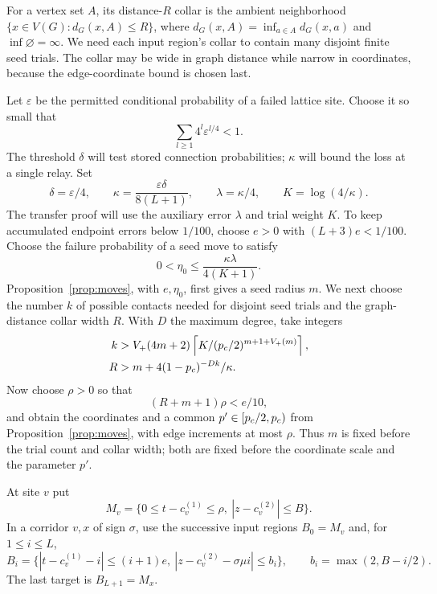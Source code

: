 For a vertex set $A$, its distance-$R$ collar is the ambient
neighborhood $\{x\in V(G):d_G(x,A)\le R\}$, where
$d_G(x,A)=\inf_{a\in A}d_G(x,a)$ and $\inf\varnothing=\infty$.
We need each input region's collar to contain many disjoint finite
seed trials. The collar may be wide in graph distance while narrow in
coordinates, because the edge-coordinate bound is chosen last.

Let $\varepsilon$ be the permitted conditional probability of a failed
lattice site. Choose it so small that
\begin{equation}\label{eq:directed-contour-series}
 \sum_{l\ge1}4^l\varepsilon^{l/4}<1.
\end{equation}
The threshold $\delta$ will test stored connection probabilities;
$\kappa$ will bound the loss at a single relay. Set
\[
 \delta=\varepsilon/4,\qquad
 \kappa=\frac{\varepsilon\delta}{8(L+1)},\qquad
 \lambda=\kappa/4,\qquad K=\log(4/\kappa).
\]
The transfer proof will use the auxiliary error $\lambda$ and trial
weight $K$. To keep accumulated endpoint errors below $1/100$, choose
$e>0$ with $(L+3)e<1/100$. Choose the failure probability of a seed
move to satisfy
\[
 0<\eta_0\le\frac{\kappa\lambda}{4(K+1)}.
\]
Proposition~\ref{prop:moves}, with $e,\eta_0$, first gives a seed
radius $m$. We next choose the number $k$ of possible contacts needed
for disjoint seed trials and the graph-distance collar width $R$.
With $D$ the maximum degree, take integers
\begin{equation}\label{eq:corridor-trial-scales}
 \begin{split}
 k&>V_+(4m+2)
       \left\lceil K/(p_c/2)^{m+1+V_+(m)}\right\rceil,\\
 R&>m+4(1-p_c)^{-Dk}/\kappa.
 \end{split}
\end{equation}
Now choose $\rho>0$ so that
\begin{equation}\label{eq:corridor-coordinate-step}
 (R+m+1)\rho<e/10,
\end{equation}
and obtain the coordinates and a common $p'\in[p_c/2,p_c)$ from
Proposition~\ref{prop:moves}, with edge increments at most $\rho$.
Thus $m$ is fixed before the trial count and collar width; both are
fixed before the coordinate scale and the parameter $p'$.

At site $v$ put
\[
 M_v=\{0\le t-c_v^{(1)}\le\rho,\
                   |z-c_v^{(2)}|\le B\}.
\]
In a corridor $v,x$ of sign $\sigma$, use the successive input regions
$B_0=M_v$ and, for $1\le i\le L$,
\begin{equation}\label{eq:relay-regions}
 B_i=\{|t-c_v^{(1)}-i|\le(i+1)e,\
 |z-c_v^{(2)}-\sigma\mu i|\le b_i\},
 \qquad b_i=\max(2,B-i/2).
\end{equation}
The last target is $B_{L+1}=M_x$.

